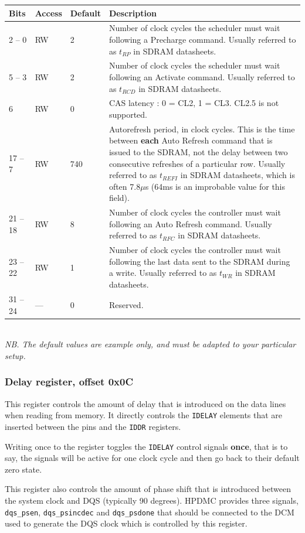 \documentclass[a4paper,11pt]{article}
\begin{document}
\begin{tabularx}{\textwidth}{|l|l|l|X|}
\hline
\bf Bits & \bf Access & \bf Default & \bf Description \\
\hline
2 -- 0 & RW & 2 & Number of clock cycles the scheduler must wait following a Precharge command. Usually referred to as $t_{RP}$ in SDRAM datasheets. \\
\hline
5 -- 3 & RW & 2 & Number of clock cycles the scheduler must wait following an Activate command. Usually referred to as $t_{RCD}$ in SDRAM datasheets. \\
\hline
6 & RW & 0 & CAS latency : 0 = CL2, 1 = CL3. CL2.5 is not supported. \\
\hline
17 -- 7 & RW & 740 & Autorefresh period, in clock cycles. This is the time between \textbf{each} Auto Refresh command that is issued to the SDRAM, not the delay between two consecutive refreshes of a particular row. Usually referred to as $t_{REFI}$ in SDRAM datasheets, which is often  7.8$\mu$s  (64ms is an improbable value for this field). \\
\hline
21 -- 18 & RW & 8 & Number of clock cycles the controller must wait following an Auto Refresh command. Usually referred to as $t_{RFC}$ in SDRAM datasheets. \\
\hline
23 -- 22 & RW & 1 & Number of clock cycles the controller must wait following the last data sent to the SDRAM during a write. Usually referred to as $t_{WR}$ in SDRAM datasheets. \\
\hline
31 -- 24 & --- & 0 & Reserved. \\
\hline
\end{tabularx}\\

\textit{NB. The default values are example only, and must be adapted to your particular setup.}

\subsubsection{Delay register, offset 0x0C}
This register controls the amount of delay that is introduced on the data lines when reading from memory. It directly controls the \verb!IDELAY! elements that are inserted between the pins and the \verb!IDDR! registers.

Writing once to the register toggles the \verb!IDELAY! control signals \textbf{once}, that is to say, the signals will be active for one clock cycle and then go back to their default zero state.

This register also controls the amount of phase shift that is introduced between the system clock and DQS (typically 90 degrees). HPDMC provides three signals, \verb!dqs_psen!, \verb!dqs_psincdec! and \verb!dqs_psdone! that should be connected to the DCM used to generate the DQS clock which is controlled by this register.
\end{document}
